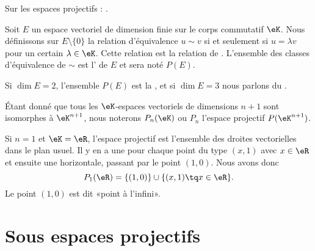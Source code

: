 
Sur les espaces projectifs : \cite{ProjRolland}.

\begin{definition}
	Soit \( E\) un espace vectoriel de dimension finie sur le corps commutatif \( \eK\). Nous définissons sur \( E\setminus\{ 0 \}\) la relation d'équivalence \( u\sim v\) si et seulement si \( u=\lambda v\) pour un certain \( \lambda\in\eK\). Cette relation est la relation de . L'ensemble des classes d'équivalence de \( \sim\) est l' de \( E\) et sera noté \( P(E)\).
\end{definition}

\begin{definition}  \label{DEFooTPPMooTDxNpg}
	Si \( \dim E=2\), l'ensemble \( P(E)\) est la , et si \( \dim E=3\) nous parlons du .
\end{definition}

Étant donné que tous les \( \eK\)-espaces vectoriels de dimensions \( n+1\) sont isomorphes à \( \eK^{n+1}\), nous noterons \( P_n(\eK)\) ou \( P_n\) l'espace projectif \( P(\eK^{n+1})\). \label{PgNotimesjNtMoW}

\begin{example}
	Si \( n=1\) et \( \eK=\eR\), l'espace projectif est l'ensemble des droites vectorielles dans le plan usuel. Il y en a une pour chaque point du type \( (x,1)\) avec \( x\in\eR\) et ensuite une horizontale, passant par le point \( (1,0)\). Nous avons donc
	\begin{equation}
		P_1(\eR)=\{ (1,0) \}\cup\{ (x,1)\tq x\in \eR \}.
	\end{equation}
	Le point \( (1,0)\) est dit «point à l'infini».
\end{example}

\section{Sous espaces projectifs}

